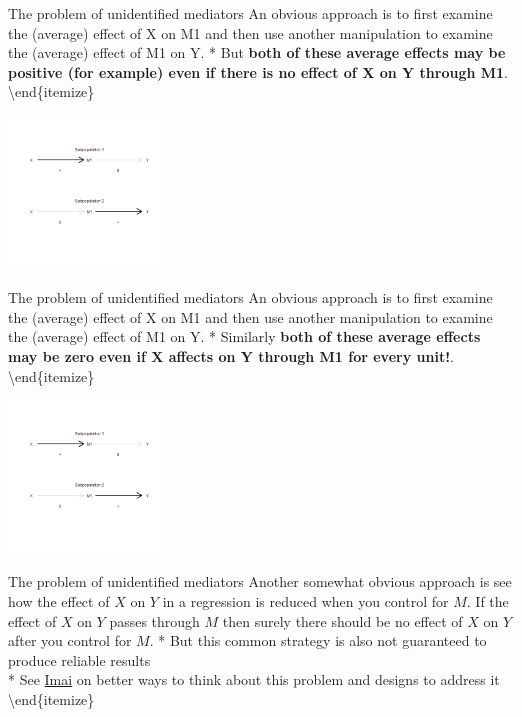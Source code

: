 \documentclass[
  11pt,
  ignorenonframetext,
]{beamer}
\begin{document}
\begin{frame}{The problem of unidentified mediators}
\protect\hypertarget{the-problem-of-unidentified-mediators-1}{}
\footnotesize * An obvious approach is to first examine the (average)
effect of X on M1 and then use another manipulation to examine the
(average) effect of M1 on Y. * But
\textbf{both of these average effects may be positive (for example) even if there is no effect of X on Y through M1}.\\
\textbackslash end\{itemize\}

\includegraphics[width=1.6in,height=\textheight]{figs/med2.png}
\end{frame}

\begin{frame}{The problem of unidentified mediators}
\protect\hypertarget{the-problem-of-unidentified-mediators-2}{}
\footnotesize * An obvious approach is to first examine the (average)
effect of X on M1 and then use another manipulation to examine the
(average) effect of M1 on Y. * Similarly
\textbf{both of these average effects may be zero even if X affects on Y through M1 for every unit!}.\\
\textbackslash end\{itemize\}

\includegraphics[width=1.6in,height=\textheight]{figs/med2.png}
\end{frame}

\begin{frame}{The problem of unidentified mediators}
\protect\hypertarget{the-problem-of-unidentified-mediators-3}{}
\footnotesize * Another somewhat obvious approach is see how the effect
of \(X\) on \(Y\) in a regression is reduced when you control for \(M\).
If the effect of \(X\) on \(Y\) passes through \(M\) then surely there
should be no effect of \(X\) on \(Y\) after you control for \(M\). * But
this common strategy is also not guaranteed to produce reliable
results\\
* See \href{http://imai.princeton.edu/projects/mechanisms.html}{Imai} on
better ways to think about this problem and designs to address it\\
\textbackslash end\{itemize\}
\end{frame}
\end{document}
